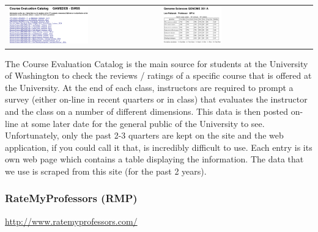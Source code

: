 \documentclass{article}
\begin{document}
\vspace{-3 pt}
\begin{center}
\begin{tabular}{ll}
    \includegraphics[width=0.54\textwidth]{cec.png}
    &
    \includegraphics[width=0.4\textwidth]{cec_2.png}
\end{tabular}
\end{center}

The Course Evaluation Catalog is the main source for students at the University of Washington to check the reviews / ratings of a specific course that is offered at the University. At the end of each class, instructors are required to prompt a survey (either on-line in recent quarters or in class) that evaluates the instructor and the class on a number of different dimensions. This data is then posted on-line at some later date for the general public of the University to see. Unfortunately, only the past 2-3 quarters are kept on the site and the web application, if you could call it that, is incredibly difficult to use. Each entry is its own web page which contains a table displaying the information. The data that we use is scraped from this site (for the past 2 years).

\subsubsection*{RateMyProfessors (RMP) \cite{ratemyprofessors}}
{\color{blue} \href{http://www.ratemyprofessors.com/}{http://www.ratemyprofessors.com/}}
\end{document}
